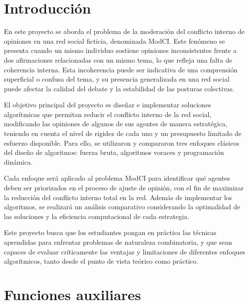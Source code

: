 \documentclass[11pt,letter]{article}
\begin{document}


    \section{Introducción}

    En este proyecto se aborda el problema de la moderación del conflicto interno de opiniones en una red social ficticia, denominada ModCI. Este fenómeno se presenta cuando un mismo individuo sostiene opiniones inconsistentes frente a dos afirmaciones relacionadas con un mismo tema, lo que refleja una falta de coherencia interna. Esta incoherencia puede ser indicativa de una comprensión superficial o confusa del tema, y su presencia generalizada en una red social puede afectar la calidad del debate y la estabilidad de las posturas colectivas.
    \par\vspace{0.5cm}
    El objetivo principal del proyecto es diseñar e implementar soluciones algorítmicas que permitan reducir el conflicto interno de la red social, modificando las opiniones de algunos de sus agentes de manera estratégica, teniendo en cuenta el nivel de rigidez de cada uno y un presupuesto limitado de esfuerzo disponible. Para ello, se utilizaron y compararon tres enfoques clásicos del diseño de algoritmos: fuerza bruta, algoritmos voraces y programación dinámica.
    \par\vspace{0.5cm}
    Cada enfoque será aplicado al problema ModCI para identificar qué agentes deben ser priorizados en el proceso de ajuste de opinión, con el fin de maximizar la reducción del conflicto interno total en la red. Además de implementar los algoritmos, se realizará un análisis comparativo considerando la optimalidad de las soluciones y la eficiencia computacional de cada estrategia.
    \par\vspace{0.5cm}
    Este proyecto busca que los estudiantes pongan en práctica las técnicas aprendidas para enfrentar problemas de naturaleza combinatoria, y que sean capaces de evaluar críticamente las ventajas y limitaciones de diferentes enfoques algorítmicos, tanto desde el punto de vista teórico como práctico.

    \newpage



    \section{Funciones auxiliares}
\end{document}
